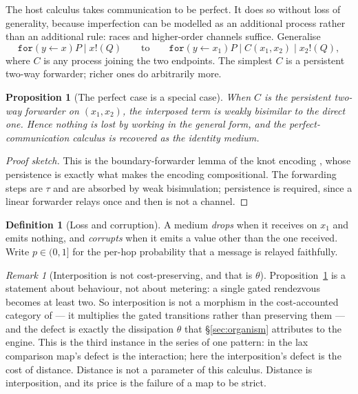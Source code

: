 \documentclass[11pt]{article}
\theoremstyle{plain}
\newtheorem{proposition}[theorem]{Proposition}
\theoremstyle{definition}
\newtheorem{definition}[theorem]{Definition}
\theoremstyle{remark}
\newtheorem{remark}[theorem]{Remark}
\begin{document}
The host calculus takes communication to be perfect. It does so without
loss of generality, because imperfection can be modelled as an additional
process rather than an additional rule: races and higher-order channels
suffice. Generalise
\[
  \texttt{for}(y \leftarrow x)P \mid x!(Q)
  \qquad\text{to}\qquad
  \texttt{for}(y \leftarrow x_1)P \mid C(x_1,x_2) \mid x_2!(Q),
\]
where $C$ is any process joining the two endpoints. The simplest $C$ is a
persistent two-way forwarder; richer ones do arbitrarily more.

\begin{proposition}[The perfect case is a special case]\label{prop:wlog}
When $C$ is the persistent two-way forwarder on $(x_1,x_2)$, the interposed
term is weakly bisimilar to the direct one. Hence nothing is lost by
working in the general form, and the perfect-communication calculus is
recovered as the identity medium.
\end{proposition}

\begin{proof}[Proof sketch]
This is the boundary-forwarder lemma of the knot encoding
\cite{knots}, whose persistence is exactly what makes the encoding
compositional. The forwarding steps are $\tau$ and are absorbed by weak
bisimulation; persistence is required, since a linear forwarder relays once
and then is not a channel.
\end{proof}

\begin{definition}[Loss and corruption]
A medium \emph{drops} when it receives on $x_1$ and emits nothing, and
\emph{corrupts} when it emits a value other than the one received. Write
$p \in (0,1]$ for the per-hop probability that a message is relayed
faithfully.
\end{definition}

\begin{remark}[Interposition is not cost-preserving, and that is $\theta$]
\label{rem:notmorphism}
Proposition~\ref{prop:wlog} is a statement about behaviour, not about
metering: a single gated rendezvous becomes at least two. So interposition
is not a morphism in the cost-accounted category of \cite{CE} --- it
multiplies the gated transitions rather than preserving them --- and the
defect is exactly the dissipation $\theta$ that \S\ref{sec:organism}
attributes to the engine. This is the third instance in the series of one
pattern: in \cite[\S4.3]{compose} the lax comparison map's defect is the
interaction; here the interposition's defect is the cost of distance.
Distance is not a parameter of this calculus. Distance is interposition,
and its price is the failure of a map to be strict.
\end{remark}
\end{document}
